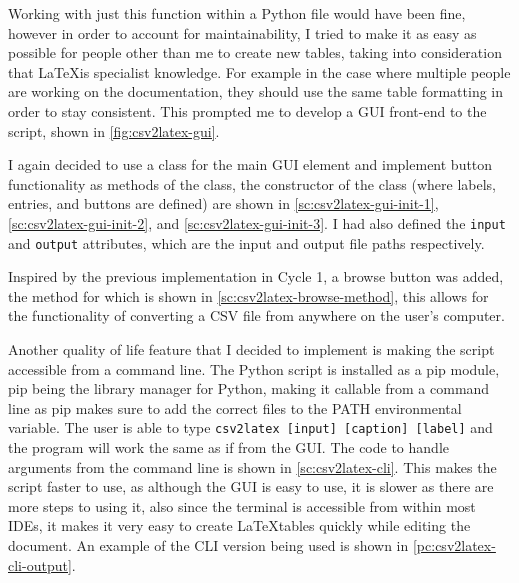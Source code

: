         Working with just this function within a Python file would have been fine, however in order to account for maintainability, I tried to make it as easy as possible for people other than me to create new tables, taking into consideration that \LaTeX is specialist knowledge. 
        For example in the case where multiple people are working on the documentation, they should use the same table formatting in order to stay consistent. 
        This prompted me to develop a GUI front-end to the script, shown in \autoref{fig:csv2latex-gui}.

        I again decided to use a class for the main GUI element and implement button functionality as methods of the class, the constructor of the class (where labels, entries, and buttons are defined) are shown in \autoref{sc:csv2latex-gui-init-1}, \autoref{sc:csv2latex-gui-init-2}, and \autoref{sc:csv2latex-gui-init-3}. 
        I had also defined the \verb|input| and \verb|output| attributes, which are the input and output file paths respectively. 

        Inspired by the previous implementation in Cycle 1, a browse button was added, the method for which is shown in \autoref{sc:csv2latex-browse-method}, this allows for the functionality of converting a CSV file from anywhere on the user's computer.

        Another quality of life feature that I decided to implement is making the script accessible from a command line. 
        The Python script is installed as a pip module, pip being the library manager for Python, making it callable from a command line as pip makes sure to add the correct files to the PATH environmental variable.  
        The user is able to type \verb|csv2latex [input] [caption] [label]| and the program will work the same as if from the GUI. 
        The code to handle arguments from the command line is shown in \autoref{sc:csv2latex-cli}.
        This makes the script faster to use, as although the GUI is easy to use, it is slower as there are more steps to using it, also since the terminal is accessible from within most IDEs, it makes it very easy to create \LaTeX tables quickly while editing the document. 
        An example of the CLI version being used is shown in \autoref{pc:csv2latex-cli-output}.

